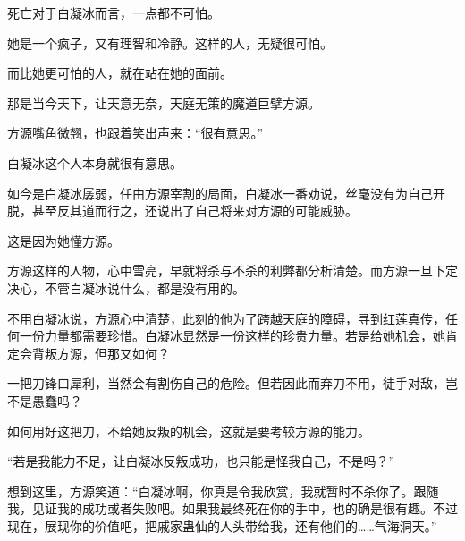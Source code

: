 \begin{this_body}
死亡对于白凝冰而言，一点都不可怕。

她是一个疯子，又有理智和冷静。这样的人，无疑很可怕。

而比她更可怕的人，就在站在她的面前。

那是当今天下，让天意无奈，天庭无策的魔道巨擘方源。

方源嘴角微翘，也跟着笑出声来：“很有意思。”

白凝冰这个人本身就很有意思。

如今是白凝冰孱弱，任由方源宰割的局面，白凝冰一番劝说，丝毫没有为自己开脱，甚至反其道而行之，还说出了自己将来对方源的可能威胁。

这是因为她懂方源。

方源这样的人物，心中雪亮，早就将杀与不杀的利弊都分析清楚。而方源一旦下定决心，不管白凝冰说什么，都是没有用的。

不用白凝冰说，方源心中清楚，此刻的他为了跨越天庭的障碍，寻到红莲真传，任何一份力量都需要珍惜。白凝冰显然是一份这样的珍贵力量。若是给她机会，她肯定会背叛方源，但那又如何？

一把刀锋口犀利，当然会有割伤自己的危险。但若因此而弃刀不用，徒手对敌，岂不是愚蠢吗？

如何用好这把刀，不给她反叛的机会，这就是要考较方源的能力。

“若是我能力不足，让白凝冰反叛成功，也只能是怪我自己，不是吗？”

想到这里，方源笑道：“白凝冰啊，你真是令我欣赏，我就暂时不杀你了。跟随我，见证我的成功或者失败吧。如果我最终死在你的手中，也的确是很有趣。不过现在，展现你的价值吧，把戚家蛊仙的人头带给我，还有他们的……气海洞天。”

\end{this_body}

